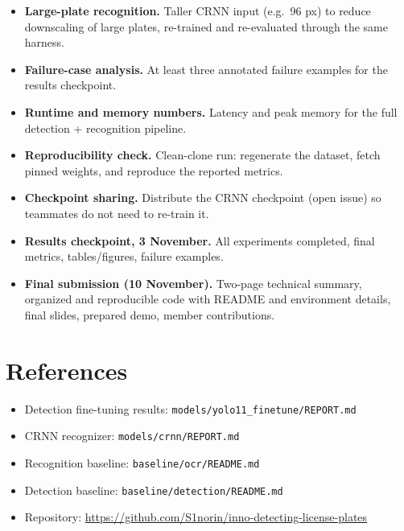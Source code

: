 \documentclass[11pt]{article}
\begin{document}
\begin{itemize}
\item \textbf{Large-plate recognition.} Taller CRNN input (e.g.\ 96 px) to
  reduce downscaling of large plates, re-trained and re-evaluated through
  the same harness.
\item \textbf{Failure-case analysis.} At least three annotated failure
  examples for the results checkpoint.
\item \textbf{Runtime and memory numbers.} Latency and peak memory for the
  full detection + recognition pipeline.
\item \textbf{Reproducibility check.} Clean-clone run: regenerate the
  dataset, fetch pinned weights, and reproduce the reported metrics.
\item \textbf{Checkpoint sharing.} Distribute the CRNN checkpoint (open
  issue) so teammates do not need to re-train it.
\item \textbf{Results checkpoint, 3 November.} All experiments completed,
  final metrics, tables/figures, failure examples.
\item \textbf{Final submission (10 November).} Two-page technical summary,
  organized and reproducible code with README and environment details, final
  slides, prepared demo, member contributions.
\end{itemize}

\section*{References}

\begin{itemize}
\item Detection fine-tuning results: \texttt{models/yolo11\_finetune/REPORT.md}
\item CRNN recognizer: \texttt{models/crnn/REPORT.md}
\item Recognition baseline: \texttt{baseline/ocr/README.md}
\item Detection baseline: \texttt{baseline/detection/README.md}
\item Repository: \url{https://github.com/S1norin/inno-detecting-license-plates}
\end{itemize}
\end{document}
